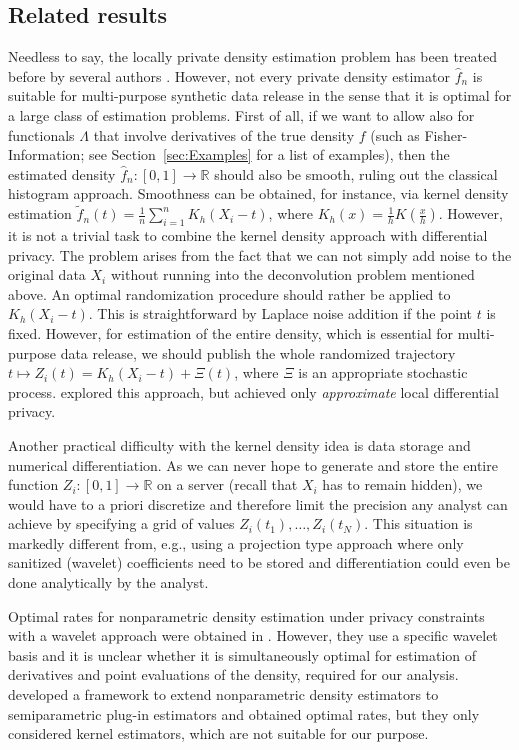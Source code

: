 \documentclass[preprint]{imsart}
\newcommand{\R}{{\mathbb R}}
\numberwithin{equation}{section}
\begin{document}
\subsection{Related results}

Needless to say, the locally private density estimation problem has been treated before by several authors \citep{Duchi17, Kroll19, ButuceaPrivacy, Gyorfi23, Kroll21, Kroll22, Schluttenhofer22}. However, not every private density estimator $\hat{f}_n$ is suitable for multi-purpose synthetic data release in the sense that it is optimal for a large class of estimation problems. First of all, if we want to allow also for functionals $\Lambda$ that involve derivatives of the true density $f$ (such as Fisher-Information; see Section~\ref{sec:Examples} for a list of examples), then the estimated density $\hat{f}_n:[0,1]\to \R$ should also be smooth, ruling out the classical histogram approach. Smoothness can be obtained, for instance, via kernel density estimation $\tilde{f}_n(t) = \frac{1}{n}\sum_{i=1}^n K_h(X_i-t)$, where $K_h(x) = \frac{1}{h}K(\frac{x}{h})$. However, it is not a trivial task to combine the kernel density approach with differential privacy. The problem arises from the fact that we can not simply add noise to the original data $X_i$ without running into the deconvolution problem mentioned above. An optimal randomization procedure should rather be applied to $K_h(X_i-t)$. This is straightforward by Laplace noise addition if the point $t$ is fixed. However, for estimation of the entire density, which is essential for multi-purpose data release, we should publish the whole randomized trajectory $t\mapsto Z_i(t) = K_h(X_i-t) + \Xi(t)$, where $\Xi$ is an appropriate stochastic process. \citet{Kroll19} explored this approach, but achieved only \emph{approximate} local differential privacy. 

Another practical difficulty with the kernel density idea is data storage and numerical differentiation. As we can never hope to generate and store the entire function $Z_i:[0,1]\to\R$ on a server (recall that $X_i$ has to remain hidden), we would have to a priori discretize and therefore limit the precision any analyst can achieve by specifying a grid of values $Z_i(t_1), \dots, Z_i(t_N)$. This situation is markedly different from, e.g., using a projection type approach where only sanitized (wavelet) coefficients need to be stored and differentiation could even be done analytically by the analyst.

Optimal rates for nonparametric density estimation under privacy constraints with a wavelet approach were obtained in \citet{ButuceaPrivacy}. However, they use a specific wavelet basis and it is unclear whether it is simultaneously optimal for estimation of derivatives and point evaluations of the density, required for our analysis. \citet{GoldsteinMesser92} developed a framework to extend nonparametric density estimators to semiparametric plug-in estimators and obtained optimal rates, but they only considered kernel estimators, which are not suitable for our purpose.
\end{document}
